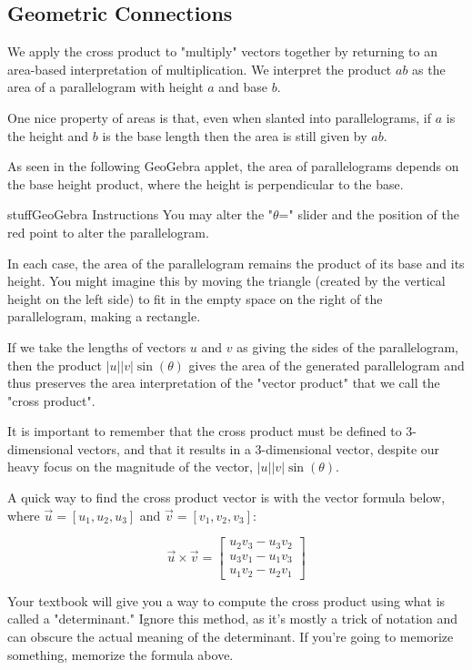 \documentclass{ximera}
\begin{document}
\subsection*{Geometric Connections}
We apply the cross product to "multiply" vectors together by returning to an area-based interpretation of multiplication. We interpret the product $ab$ as the area of a parallelogram with height $a$ and base $b$. 

One nice property of areas is that, even when slanted into parallelograms, if $a$ is the height and $b$ is the base length then the area is still given by $ab$.

As seen in the following GeoGebra applet, the area of parallelograms depends on the base height product, where the height is perpendicular to the base. 

\begin{expandable}{stuff}{GeoGebra Instructions}
    You may alter the "$\theta$=" slider and the position of the red point to alter the parallelogram.
\end{expandable}

\begin{center}
\end{center}

In each case, the area of the parallelogram remains the product of its base and its height. You might imagine this by moving the triangle (created by the vertical height on the left side) to fit in the empty space on the right of the parallelogram, making a rectangle.

If we take the lengths of vectors $u$ and $v$ as giving the sides of the parallelogram, then the product $|u||v|\sin(\theta)$ gives the area of the generated parallelogram and thus preserves the area interpretation of the "vector product" that we call the "cross product".

It is important to remember that the cross product must be defined to 3-dimensional vectors, and that it results in a 3-dimensional vector, despite our heavy focus on the magnitude of the vector, $|u||v|\sin(\theta)$.

\begin{definition}
    A quick way to find the cross product vector is with the vector formula below, where $\vec{u}=[u_1,u_2,u_3]$ and $\vec{v}=[v_1,v_2,v_3]$: 

    \[\vec{u}\times \vec{v} = 
    \begin{bmatrix}
    u_2 v_3 - u_3 v_2 \\
    u_3 v_1 - u_1 v_3 \\
    u_1 v_2 - u_2 v_1
    \end{bmatrix}\]
\end{definition}

\begin{remark}
Your textbook will give you a way to compute the cross product using what is called a "determinant." Ignore this method, as it's mostly a trick of notation and can obscure the actual meaning of the determinant. If you're going to memorize something, memorize the formula above.
\end{remark}
\end{document}
